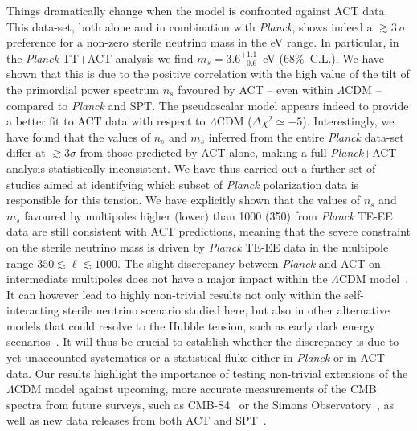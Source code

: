 \documentclass[a4paper,11pt]{article}
\begin{document}
Things dramatically change when the model is confronted against ACT data.
This data-set, both alone and in combination with \emph{Planck}, shows indeed a $\gtrsim 3~\sigma$ preference for a non-zero sterile neutrino mass in the eV range.
In particular, in the \emph{Planck} TT+ACT analysis we find $m_s=3.6^{+1.1}_{-0.6}$~eV (68\%~C.L.).
We have shown that this is due to the positive correlation with the high value of the tilt of the primordial power spectrum $n_s$ favoured by ACT -- even within $\Lambda$CDM -- compared to \emph{Planck} and SPT.
The pseudoscalar model appears indeed to provide a better fit to ACT data with respect to $\Lambda$CDM ($\Delta\chi^2 \simeq -5$).
Interestingly, we have found that the values of $n_s$ and $m_s$ inferred from the entire \emph{Planck} data-set differ at \textbf{$\gtrsim 3\sigma$} from those predicted by ACT alone, making a full \emph{Planck}+ACT analysis statistically inconsistent.
We have thus carried out a further set of studies aimed {at identifying} which subset of \emph{Planck} polarization data is responsible for this tension.
We have explicitly shown that the values of $n_s$ and $m_s$ favoured by multipoles higher (lower) than 1000 (350) from \emph{Planck} TE-EE data are still consistent with ACT predictions, meaning that the severe constraint on the sterile neutrino mass is driven by \emph{Planck} TE-EE data in the multipole range $350\lesssim\ell\lesssim1000$.
The slight discrepancy between \emph{Planck} and ACT on intermediate multipoles does not have a major impact within the $\Lambda$CDM model~\cite{Aiola:2020azj}. It can however lead to highly non-trivial results not only within the self-interacting sterile neutrino scenario studied here, but also in other alternative {models that could resolve} to the Hubble tension, such as early dark energy scenarios~\cite{Hill:2021yec,Poulin:2021bjr,Smith:2022hwi,Jiang:2022uyg}. 
It will thus be crucial to establish whether the discrepancy is due to yet unaccounted systematics or a statistical fluke either in \emph{Planck} or in ACT data.
Our results highlight the {importance} of testing non-trivial extensions of the $\Lambda$CDM model against upcoming, more accurate measurements of the CMB spectra from future surveys, such as CMB-S4~\cite{CMB-S4:2016ple} or the Simons Observatory~\cite{SimonsObservatory:2018koc}, as well as new data releases from both ACT and SPT~\cite{SPT-3G:2021eoc}.

\appendix
\end{document}
